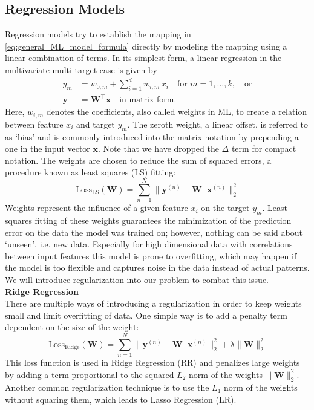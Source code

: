 \subsection{Regression Models}
\label{subsec:background_ml_model_types}
Regression models try to establish the mapping in \autoref{eq:general_ML_model_formula} directly by modeling the mapping using a linear combination of terms. In its simplest form, a linear regression in the multivariate multi-target case is given by 
\begin{equation}
    \label{eq:linear_regression_formula}
    \begin{aligned}
        y_m &= w_{0, m} + \sum_{i=1}^d w_{i,m} \, x_i \quad \text{for } m = 1, \dots, k, \quad \text{or}\\
        \mathbf{y} &= \mathbf{W^\top} \mathbf{x} \quad \text{in matrix form}.
    \end{aligned}
\end{equation}
Here, $w_{i,m}$ denotes the coefficients, also called weights in ML, to create a relation between feature $x_i$ and target $y_m$. The zeroth weight, a linear offset, is referred to as `bias' and is commonly introduced into the matrix notation by prepending a one in the input vector $\mathbf{x}$. Note that we have dropped the $\Delta$ term for compact notation. The weights are chosen to reduce the sum of squared errors, a procedure known as least squares (LS) fitting: 
\begin{equation}
    \label{eq:least_squares_error}
    \text{Loss}_\text{LS}(\mathbf{W}) = \sum_{n=1}^{N}\|\mathbf{y}^{(n)} - \mathbf{W^\top} \mathbf{x}^{(n)}\|_2^2
\end{equation}
Weights represent the influence of a given feature $x_i$ on the target $y_m$. Least squares fitting of these weights guarantees the minimization of the prediction error on the data the model was trained on; however, nothing can be said about `unseen', i.e. new data. Especially for high dimensional data with correlations between input features this model is prone to overfitting, which may happen if the model is too flexible and captures noise in the data instead of actual patterns. We will introduce regularization into our problem to combat this issue.\\

\textbf{Ridge Regression}\\
There are multiple ways of introducing a regularization in order to keep weights small and limit overfitting of data. One simple way is to add a penalty term dependent on the size of the weight: 
\begin{equation}
    \label{eq:regularized_least_squares_error}
    \text{Loss}_\text{Ridge}(\mathbf{W}) = \sum_{n=1}^{N}\|\mathbf{y}^{(n)} - \mathbf{W^\top} \mathbf{x}^{(n)}\|_2^2 + \lambda \|\mathbf{W}\|_2^2
\end{equation}
This loss function is used in Ridge Regression (RR) and penalizes large weights by adding a term proportional to the squared $L_2$ norm of the weights $\|\mathbf{W}\|_2^2$. Another common regularization technique is to use the $L_1$ norm of the weights without squaring them, which leads to Lasso Regression (LR). 

